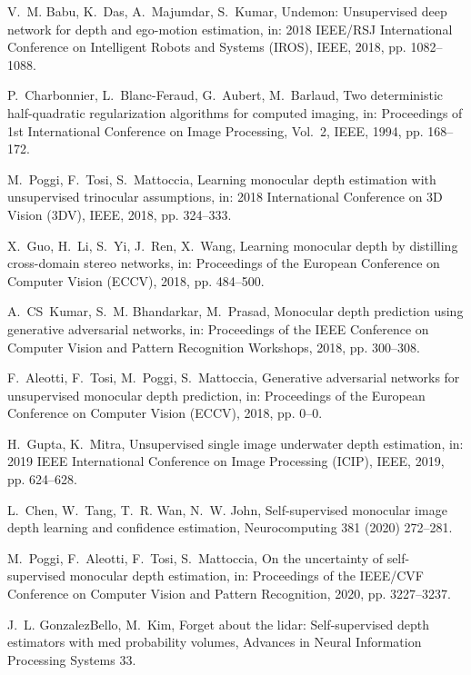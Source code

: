 \documentclass[5p]{elsarticle}
\begin{document}
\begin{thebibliography}{100}
V.~M. Babu, K.~Das, A.~Majumdar, S.~Kumar, Undemon: Unsupervised deep network
  for depth and ego-motion estimation, in: 2018 IEEE/RSJ International
  Conference on Intelligent Robots and Systems (IROS), IEEE, 2018, pp.
  1082--1088.

P.~Charbonnier, L.~Blanc-Feraud, G.~Aubert, M.~Barlaud, Two deterministic
  half-quadratic regularization algorithms for computed imaging, in:
  Proceedings of 1st International Conference on Image Processing, Vol.~2,
  IEEE, 1994, pp. 168--172.

M.~Poggi, F.~Tosi, S.~Mattoccia, Learning monocular depth estimation with
  unsupervised trinocular assumptions, in: 2018 International Conference on 3D
  Vision (3DV), IEEE, 2018, pp. 324--333.

X.~Guo, H.~Li, S.~Yi, J.~Ren, X.~Wang, Learning monocular depth by distilling
  cross-domain stereo networks, in: Proceedings of the European Conference on
  Computer Vision (ECCV), 2018, pp. 484--500.

A.~CS~Kumar, S.~M. Bhandarkar, M.~Prasad, Monocular depth prediction using
  generative adversarial networks, in: Proceedings of the IEEE Conference on
  Computer Vision and Pattern Recognition Workshops, 2018, pp. 300--308.

F.~Aleotti, F.~Tosi, M.~Poggi, S.~Mattoccia, Generative adversarial networks
  for unsupervised monocular depth prediction, in: Proceedings of the European
  Conference on Computer Vision (ECCV), 2018, pp. 0--0.

H.~Gupta, K.~Mitra, Unsupervised single image underwater depth estimation, in:
  2019 IEEE International Conference on Image Processing (ICIP), IEEE, 2019,
  pp. 624--628.

L.~Chen, W.~Tang, T.~R. Wan, N.~W. John, Self-supervised monocular image depth
  learning and confidence estimation, Neurocomputing 381 (2020) 272--281.

M.~Poggi, F.~Aleotti, F.~Tosi, S.~Mattoccia, On the uncertainty of
  self-supervised monocular depth estimation, in: Proceedings of the IEEE/CVF
  Conference on Computer Vision and Pattern Recognition, 2020, pp. 3227--3237.

J.~L. GonzalezBello, M.~Kim, Forget about the lidar: Self-supervised depth
  estimators with med probability volumes, Advances in Neural Information
  Processing Systems 33.


\end{thebibliography}
\end{document}
